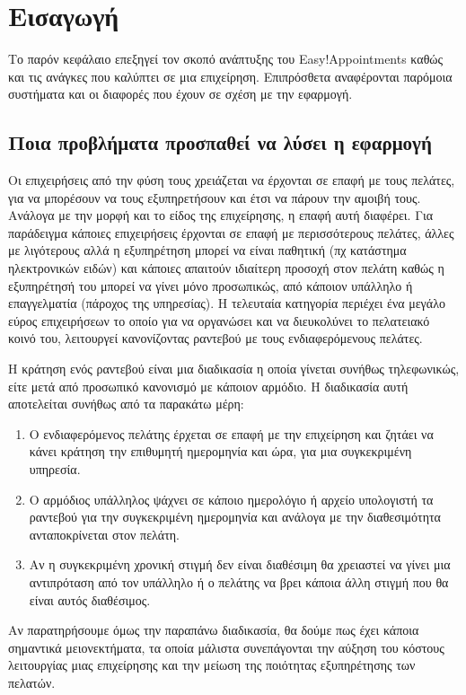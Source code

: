 \chapter{Εισαγωγή}
\leftmark\rightmark
Το παρόν κεφάλαιο επεξηγεί τον σκοπό ανάπτυξης του Easy!Appointments καθώς και τις ανάγκες που καλύπτει σε μια επιχείρηση. Επιπρόσθετα αναφέρονται παρόμοια συστήματα και οι διαφορές που έχουν σε σχέση με την εφαρμογή.

\section {Ποια προβλήματα προσπαθεί να λύσει η εφαρμογή}
Οι επιχειρήσεις από την φύση τους χρειάζεται να έρχονται σε επαφή με τους πελάτες, για να μπορέσουν να τους εξυπηρετήσουν και έτσι να πάρουν την αμοιβή τους. Ανάλογα με την μορφή και το είδος της επιχείρησης, η επαφή αυτή διαφέρει. Για παράδειγμα κάποιες επιχειρήσεις έρχονται σε επαφή με περισσότερους πελάτες, άλλες με λιγότερους αλλά η εξυπηρέτηση μπορεί να είναι παθητική (πχ κατάστημα ηλεκτρονικών ειδών) και κάποιες απαιτούν ιδιαίτερη προσοχή στον πελάτη καθώς η εξυπηρέτησή του μπορεί να γίνει μόνο προσωπικώς, από κάποιον υπάλληλο ή επαγγελματία (πάροχος της υπηρεσίας). Η τελευταία κατηγορία περιέχει ένα μεγάλο εύρος επιχειρήσεων το οποίο για να οργανώσει και να διευκολύνει το πελατειακό κοινό του, λειτουργεί κανονίζοντας ραντεβού με τους ενδιαφερόμενους πελάτες.

Η κράτηση ενός ραντεβού είναι μια διαδικασία η οποία γίνεται συνήθως τηλεφωνικώς, είτε μετά από προσωπικό κανονισμό με κάποιον αρμόδιο. Η διαδικασία αυτή αποτελείται συνήθως από τα παρακάτω μέρη:  
\begin{enumerate}
\item Ο ενδιαφερόμενος πελάτης έρχεται σε επαφή με την επιχείρηση και ζητάει να κάνει κράτηση την επιθυμητή ημερομηνία και ώρα, για μια συγκεκριμένη υπηρεσία. 
\item Ο αρμόδιος υπάλληλος ψάχνει σε κάποιο ημερολόγιο ή αρχείο υπολογιστή τα ραντεβού για την συγκεκριμένη ημερομηνία και ανάλογα με την διαθεσιμότητα ανταποκρίνεται στον πελάτη.
\item Αν η συγκεκριμένη χρονική στιγμή δεν είναι διαθέσιμη θα χρειαστεί να γίνει μια αντιπρόταση από τον υπάλληλο ή ο πελάτης να βρει κάποια άλλη στιγμή που θα είναι αυτός διαθέσιμος.
\end{enumerate} 
Αν παρατηρήσουμε όμως την παραπάνω διαδικασία, θα δούμε πως έχει κάποια σημαντικά μειονεκτήματα, τα οποία μάλιστα συνεπάγονται την αύξηση του κόστους λειτουργίας μιας επιχείρησης και την μείωση της ποιότητας εξυπηρέτησης των πελατών. 

